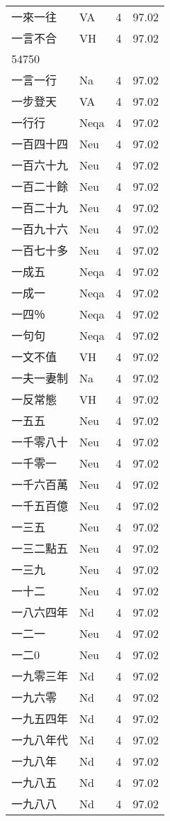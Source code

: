 \documentclass[twocolumn]{book}
\begin{document}
\begin{supertabular}{llrr}
一來一往 & VA & 4 &  97.02\\
一言不合 & VH & 4 &  97.02\\
54750\\
一言一行 & Na & 4 &  97.02\\
一步登天 & VA & 4 &  97.02\\
一行行 & Neqa & 4 &  97.02\\
一百四十四 & Neu & 4 &  97.02\\
一百六十九 & Neu & 4 &  97.02\\
一百二十餘 & Neu & 4 &  97.02\\
一百二十九 & Neu & 4 &  97.02\\
一百九十六 & Neu & 4 &  97.02\\
一百七十多 & Neu & 4 &  97.02\\
一成五 & Neqa & 4 &  97.02\\
一成一 & Neqa & 4 &  97.02\\
一四％ & Neqa & 4 &  97.02\\
一句句 & Neqa & 4 &  97.02\\
一文不值 & VH & 4 &  97.02\\
一夫一妻制 & Na & 4 &  97.02\\
一反常態 & VH & 4 &  97.02\\
一五五 & Neu & 4 &  97.02\\
一千零八十 & Neu & 4 &  97.02\\
一千零一 & Neu & 4 &  97.02\\
一千六百萬 & Neu & 4 &  97.02\\
一千五百億 & Neu & 4 &  97.02\\
一三五 & Neu & 4 &  97.02\\
一三二點五 & Neu & 4 &  97.02\\
一三九 & Neu & 4 &  97.02\\
一十二 & Neu & 4 &  97.02\\
一八六四年 & Nd & 4 &  97.02\\
一二一 & Neu & 4 &  97.02\\
一二0 & Neu & 4 &  97.02\\
一九零三年 & Nd & 4 &  97.02\\
一九六零 & Nd & 4 &  97.02\\
一九五四年 & Nd & 4 &  97.02\\
一九八年代 & Nd & 4 &  97.02\\
一九八年 & Nd & 4 &  97.02\\
一九八五 & Nd & 4 &  97.02\\
一九八八 & Nd & 4 &  97.02\\

\end{supertabular}
\end{document}
